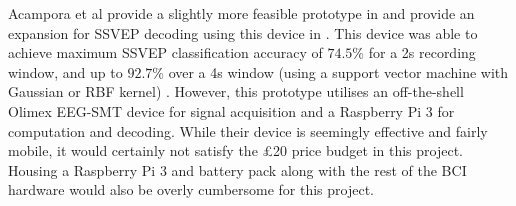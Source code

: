 Acampora et al provide a slightly more feasible prototype in \cite{acampora-dataset} and provide an expansion for SSVEP decoding using this device in \cite{acampora-svm-clf}. This device was able to achieve maximum SSVEP classification accuracy of $74.5\%$ for a 2s recording window, and up to $92.7\%$ over a 4s window (using a support vector machine with Gaussian or RBF kernel) \cite{acampora-svm-clf}. However, this prototype utilises an off-the-shell Olimex EEG-SMT device for signal acquisition and a Raspberry Pi 3 for computation and decoding. While their device is seemingly effective and fairly mobile, it would certainly not satisfy the £20 price budget in this project. Housing a Raspberry Pi 3 and battery pack along with the rest of the BCI hardware would also be overly cumbersome for this project.
